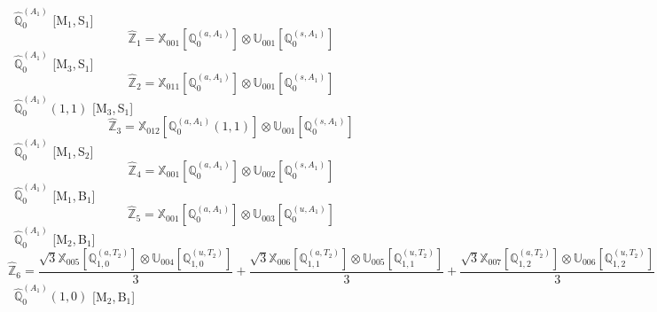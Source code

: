 \documentclass[fleqn,10pt,landscape]{article}
\begin{document}
\begin{itemize}
\vspace{4mm}
\noindent {} $\,\,\,\hat{\mathbb{Q}}_{0}^{(A_{1})}$ [M$_{1}$,\,S$_{1}$]
\begin{dmath*}
\hat{\mathbb{Z}}_{1}=\mathbb{X}_{001}[\mathbb{Q}_{0}^{(a,A_{1})}] \otimes\mathbb{U}_{001}[\mathbb{Q}_{0}^{(s,A_{1})}]
\end{dmath*}
\vspace{4mm}
\noindent {} $\,\,\,\hat{\mathbb{Q}}_{0}^{(A_{1})}$ [M$_{3}$,\,S$_{1}$]
\begin{dmath*}
\hat{\mathbb{Z}}_{2}=\mathbb{X}_{011}[\mathbb{Q}_{0}^{(a,A_{1})}] \otimes\mathbb{U}_{001}[\mathbb{Q}_{0}^{(s,A_{1})}]
\end{dmath*}
\vspace{4mm}
\noindent {} $\,\,\,\hat{\mathbb{Q}}_{0}^{(A_{1})}(1,1)$ [M$_{3}$,\,S$_{1}$]
\begin{dmath*}
\hat{\mathbb{Z}}_{3}=\mathbb{X}_{012}[\mathbb{Q}_{0}^{(a,A_{1})}(1,1)] \otimes\mathbb{U}_{001}[\mathbb{Q}_{0}^{(s,A_{1})}]
\end{dmath*}
\vspace{4mm}
\noindent {} $\,\,\,\hat{\mathbb{Q}}_{0}^{(A_{1})}$ [M$_{1}$,\,S$_{2}$]
\begin{dmath*}
\hat{\mathbb{Z}}_{4}=\mathbb{X}_{001}[\mathbb{Q}_{0}^{(a,A_{1})}] \otimes\mathbb{U}_{002}[\mathbb{Q}_{0}^{(s,A_{1})}]
\end{dmath*}
\vspace{4mm}
\noindent {} $\,\,\,\hat{\mathbb{Q}}_{0}^{(A_{1})}$ [M$_{1}$,\,B$_{1}$]
\begin{dmath*}
\hat{\mathbb{Z}}_{5}=\mathbb{X}_{001}[\mathbb{Q}_{0}^{(a,A_{1})}] \otimes\mathbb{U}_{003}[\mathbb{Q}_{0}^{(u,A_{1})}]
\end{dmath*}
\vspace{4mm}
\noindent {} $\,\,\,\hat{\mathbb{Q}}_{0}^{(A_{1})}$ [M$_{2}$,\,B$_{1}$]
\begin{dmath*}
\hat{\mathbb{Z}}_{6}=\frac{\sqrt{3} \mathbb{X}_{005}[\mathbb{Q}_{1,0}^{(a,T_{2})}] \otimes\mathbb{U}_{004}[\mathbb{Q}_{1,0}^{(u,T_{2})}]}{3} + \frac{\sqrt{3} \mathbb{X}_{006}[\mathbb{Q}_{1,1}^{(a,T_{2})}] \otimes\mathbb{U}_{005}[\mathbb{Q}_{1,1}^{(u,T_{2})}]}{3} + \frac{\sqrt{3} \mathbb{X}_{007}[\mathbb{Q}_{1,2}^{(a,T_{2})}] \otimes\mathbb{U}_{006}[\mathbb{Q}_{1,2}^{(u,T_{2})}]}{3}
\end{dmath*}
\vspace{4mm}
\noindent {} $\,\,\,\hat{\mathbb{Q}}_{0}^{(A_{1})}(1,0)$ [M$_{2}$,\,B$_{1}$]
\begin{dmath*}

\end{dmath*}
\end{itemize}
\end{document}
